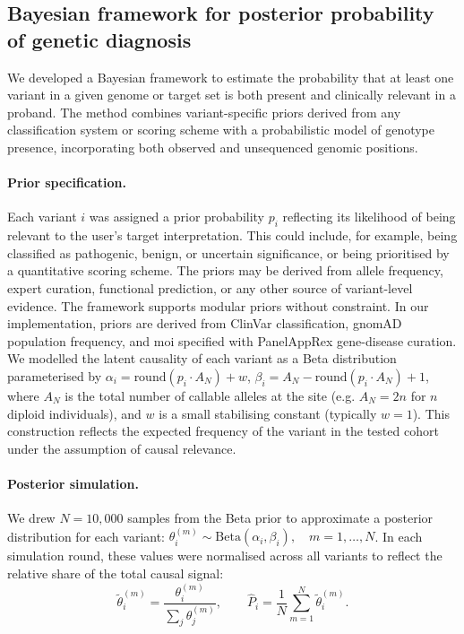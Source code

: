 
\subsection{Bayesian framework for posterior probability of genetic diagnosis}

We developed a Bayesian framework to estimate the probability that at least one variant in a given genome or target set is both present and clinically relevant in a proband. The method combines variant-specific priors derived from any classification system or scoring scheme with a probabilistic model of genotype presence, incorporating both observed and unsequenced genomic positions.

\paragraph{Prior specification.}
Each variant \( i \) was assigned a prior probability \( p_i \) reflecting its likelihood of being relevant to the user's target interpretation. This could include, for example, being classified as pathogenic, benign, or uncertain significance, or being prioritised by a quantitative scoring scheme. The priors may be derived from allele frequency, expert curation, functional prediction, or any other source of variant-level evidence. The framework supports modular priors without constraint. %
In our implementation, priors are derived from ClinVar classification, gnomAD population frequency, and \ac{moi} specified with PanelAppRex gene-disease curation. We modelled the latent causality of each variant as a Beta distribution parameterised by
$\alpha_i = \text{round}(p_i \cdot A_N) + w$, 
$\beta_i = A_N - \text{round}(p_i \cdot A_N) + 1$,
where \( A_N \) is the total number of callable alleles at the site (e.g. \( A_N = 2n \) for \( n \) diploid individuals), and \( w \) is a small stabilising constant (typically \( w = 1 \)). This construction reflects the expected frequency of the variant in the tested cohort under the assumption of causal relevance.

\paragraph{Posterior simulation.}
We drew \( N = 10{,}000 \) samples from the Beta prior to approximate a posterior distribution for each variant:
$\theta_i^{(m)} \sim \text{Beta}(\alpha_i, \beta_i), \quad m = 1,\dots,N$.
In each simulation round, these values were normalised across all variants to reflect the relative share of the total causal signal:
$$
\tilde{\theta}_i^{(m)} = \frac{\theta_i^{(m)}}{\sum_j \theta_j^{(m)}}, \qquad \hat{P}_i = \frac{1}{N} \sum_{m=1}^{N} \tilde{\theta}_i^{(m)}.
$$

